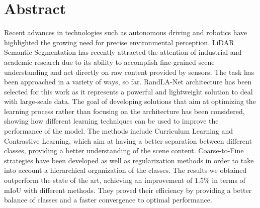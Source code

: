 \chapter*{Abstract}\label{ch:abstract}
Recent advances in technologies such as autonomous driving and robotics have highlighted the growing need for precise environmental perception. LiDAR Semantic Segmentation has recently attracted the attention of industrial and academic research due to its ability to accomplish fine-grained scene understanding and act directly on raw content provided by sensors. The task has been approached in a variety of ways, so far. RandLA-Net architecture has been selected for this work as it represents a powerful and lightweight solution to deal with large-scale data. The goal of developing solutions that aim at optimizing the learning process rather than focusing on the architecture has been considered, showing how different learning techniques can be used to improve the performance of the model. The methods include Curriculum Learning and Contrastive Learning, which aim at having a better separation between different classes, providing a better understanding of the scene content. Coarse-to-Fine strategies have been developed as well as regularization methods in order to take into account a hierarchical organization of the classes. The results we obtained outperform the state of the art, achieving an improvement of $1.5\%$ in terms of mIoU with different methods. They proved their efficiency by providing a better balance of classes and a faster convergence to optimal performance.